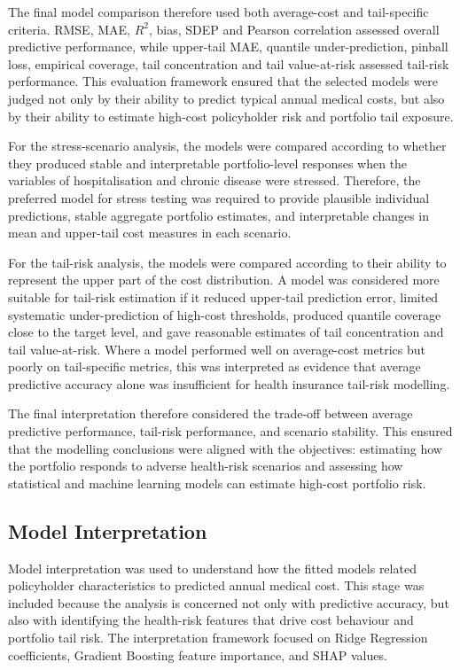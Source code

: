 	The final model comparison therefore used both average-cost and tail-specific criteria. RMSE, MAE, \(R^2\), bias, SDEP and Pearson correlation assessed overall predictive performance, while upper-tail MAE, quantile under-prediction, pinball loss, empirical coverage, tail concentration and tail value-at-risk assessed tail-risk performance. This evaluation framework ensured that the selected models were judged not only by their ability to predict typical annual medical costs, but also by their ability to estimate high-cost policyholder risk and portfolio tail exposure.
	
	For the stress-scenario analysis, the models were compared according to whether they produced stable and interpretable portfolio-level responses when the variables of hospitalisation and chronic disease were stressed. Therefore, the preferred model for stress testing was required to provide plausible individual predictions, stable aggregate portfolio estimates, and interpretable changes in mean and upper-tail cost measures in each scenario.
	
	For the tail-risk analysis, the models were compared according to their ability to represent the upper part of the cost distribution. A model was considered more suitable for tail-risk estimation if it reduced upper-tail prediction error, limited systematic under-prediction of high-cost thresholds, produced quantile coverage close to the target level, and gave reasonable estimates of tail concentration and tail value-at-risk. Where a model performed well on average-cost metrics but poorly on tail-specific metrics, this was interpreted as evidence that average predictive accuracy alone was insufficient for health insurance tail-risk modelling.
	
	The final interpretation therefore considered the trade-off between average predictive performance, tail-risk performance, and scenario stability. This ensured that the modelling conclusions were aligned with the objectives: estimating how the portfolio responds to adverse health-risk scenarios and assessing how statistical and machine learning models can estimate high-cost portfolio risk.
	
	\subsection{Model Interpretation}
	
	Model interpretation was used to understand how the fitted models related policyholder characteristics to predicted annual medical cost. This stage was included because the analysis is concerned not only with predictive accuracy, but also with identifying the health-risk features that drive cost behaviour and portfolio tail risk. The interpretation framework focused on Ridge Regression coefficients, Gradient Boosting feature importance, and SHAP values.
	
